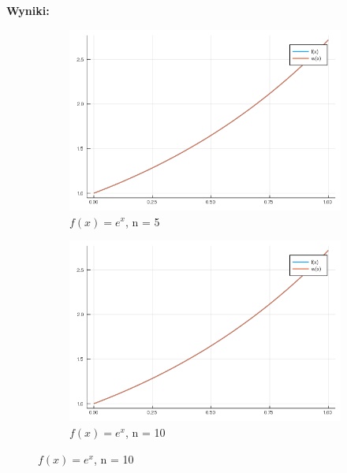 \documentclass{article}
\begin{document}
\noindent \textbf{Wyniki: }
\begin{figure}[ht]
	\begin{subfigure}{.5\textwidth}
		\centering
		\includegraphics[width=.8\linewidth]{plots/5_1.png}  
		\caption*{$f(x) = e^x$, n = 5}
	\end{subfigure}
	\begin{subfigure}{.5\textwidth}
		\centering
		\includegraphics[width=.8\linewidth]{plots/5_2.png}  
		\caption*{$f(x) = e^x$, n = 10}
	\end{subfigure}
\end{figure}
\end{document}
